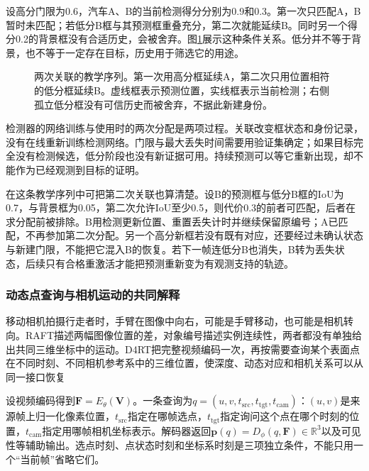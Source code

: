 设高分门限为0.6，汽车A、B的当前检测得分分别为0.9和0.3。第一次只匹配A，B暂时未匹配；若低分B框与其预测框重叠充分，第二次就能延续B。同时另一个得分0.2的背景框没有合适历史，会被舍弃。图\ref{fig:vision-bytetrack-association}展示这种条件关系。低分并不等于背景，也不等于一定存在目标，历史用于筛选它的用途。

\begin{figure}[htbp]
  \centering
  
  \caption{两次关联的教学序列。第一次用高分框延续A，第二次只用位置相符的低分框延续B。虚线框表示预测位置，实线框表示当前检测；右侧孤立低分框没有可信历史而被舍弃，不据此新建身份。}
  \label{fig:vision-bytetrack-association}
\end{figure}

检测器的网络训练与使用时的两次分配是两项过程。关联改变框状态和身份记录，没有在线重新训练检测网络。门限与最大丢失时间需要用验证集确定；如果目标完全没有检测候选，低分阶段也没有新证据可用。持续预测可以等它重新出现，却不能作为已经观测到目标的证明。

在这条教学序列中可把第二次关联也算清楚。设B的预测框与低分B框的IoU为0.7，与背景框为0.05，第二次允许IoU至少0.5，则代价0.3的前者可匹配，后者在求分配前被排除。B用检测更新位置、重置丢失计时并继续保留原编号；A已匹配，不再参加第二次分配。另一个高分新框若没有既有对应，还要经过未确认状态与新建门限，不能把它混入B的恢复。若下一帧连低分B也消失，B转为丢失状态，后续只有合格重激活才能把预测重新变为有观测支持的轨迹。

\subsubsection{动态点查询与相机运动的共同解释}
\label{sec:vision-video-d4rt}

移动相机拍摄行走者时，手臂在图像中向右，可能是手臂移动，也可能是相机转向。RAFT描述两幅图像位置的差，对象编号描述实例连续性，两者都没有单独给出共同三维坐标中的运动。D4RT把完整视频编码一次，再按需要查询某个表面点在不同时刻、不同相机参考系中的三维位置，使深度、动态对应和相机关系可以从同一接口恢复

设视频编码得到$\bm{F}=E_\theta(\bm{V})$。一条查询为$q=(u,v,t_{\mathrm{src}},t_{\mathrm{tgt}},t_{\mathrm{cam}})$：$(u,v)$是来源帧上归一化像素位置，$t_{\mathrm{src}}$指定在哪帧选点，$t_{\mathrm{tgt}}$指定询问这个点在哪个时刻的位置，$t_{\mathrm{cam}}$指定用哪帧相机坐标表示。解码器返回$\bm{p}(q)=D_\phi(q,\bm{F})\in\mathbb{R}^{3}$以及可见性等辅助输出。选点时刻、点状态时刻和坐标系时刻是三项独立条件，不能只用一个“当前帧”省略它们。

